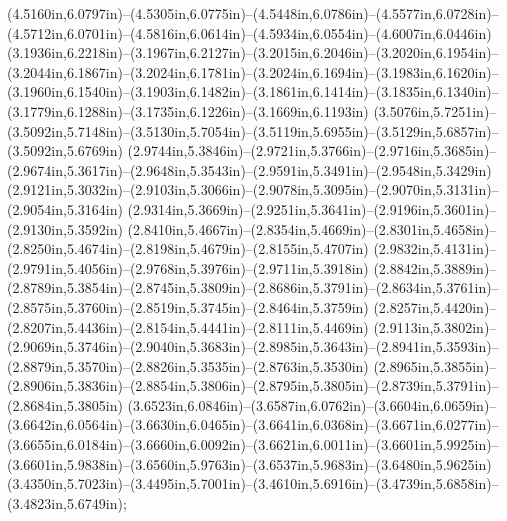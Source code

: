 (4.5160in,6.0797in)--(4.5305in,6.0775in)--(4.5448in,6.0786in)--(4.5577in,6.0728in)--(4.5712in,6.0701in)--(4.5816in,6.0614in)--(4.5934in,6.0554in)--(4.6007in,6.0446in) (3.1936in,6.2218in)--(3.1967in,6.2127in)--(3.2015in,6.2046in)--(3.2020in,6.1954in)--(3.2044in,6.1867in)--(3.2024in,6.1781in)--(3.2024in,6.1694in)--(3.1983in,6.1620in)--(3.1960in,6.1540in)--(3.1903in,6.1482in)--(3.1861in,6.1414in)--(3.1835in,6.1340in)--(3.1779in,6.1288in)--(3.1735in,6.1226in)--(3.1669in,6.1193in) (3.5076in,5.7251in)--(3.5092in,5.7148in)--(3.5130in,5.7054in)--(3.5119in,5.6955in)--(3.5129in,5.6857in)--(3.5092in,5.6769in) (2.9744in,5.3846in)--(2.9721in,5.3766in)--(2.9716in,5.3685in)--(2.9674in,5.3617in)--(2.9648in,5.3543in)--(2.9591in,5.3491in)--(2.9548in,5.3429in) (2.9121in,5.3032in)--(2.9103in,5.3066in)--(2.9078in,5.3095in)--(2.9070in,5.3131in)--(2.9054in,5.3164in) (2.9314in,5.3669in)--(2.9251in,5.3641in)--(2.9196in,5.3601in)--(2.9130in,5.3592in) (2.8410in,5.4667in)--(2.8354in,5.4669in)--(2.8301in,5.4658in)--(2.8250in,5.4674in)--(2.8198in,5.4679in)--(2.8155in,5.4707in) (2.9832in,5.4131in)--(2.9791in,5.4056in)--(2.9768in,5.3976in)--(2.9711in,5.3918in) (2.8842in,5.3889in)--(2.8789in,5.3854in)--(2.8745in,5.3809in)--(2.8686in,5.3791in)--(2.8634in,5.3761in)--(2.8575in,5.3760in)--(2.8519in,5.3745in)--(2.8464in,5.3759in) (2.8257in,5.4420in)--(2.8207in,5.4436in)--(2.8154in,5.4441in)--(2.8111in,5.4469in)
(2.9113in,5.3802in)--(2.9069in,5.3746in)--(2.9040in,5.3683in)--(2.8985in,5.3643in)--(2.8941in,5.3593in)--(2.8879in,5.3570in)--(2.8826in,5.3535in)--(2.8763in,5.3530in) (2.8965in,5.3855in)--(2.8906in,5.3836in)--(2.8854in,5.3806in)--(2.8795in,5.3805in)--(2.8739in,5.3791in)--(2.8684in,5.3805in) (3.6523in,6.0846in)--(3.6587in,6.0762in)--(3.6604in,6.0659in)--(3.6642in,6.0564in)--(3.6630in,6.0465in)--(3.6641in,6.0368in)--(3.6671in,6.0277in)--(3.6655in,6.0184in)--(3.6660in,6.0092in)--(3.6621in,6.0011in)--(3.6601in,5.9925in)--(3.6601in,5.9838in)--(3.6560in,5.9763in)--(3.6537in,5.9683in)--(3.6480in,5.9625in) (3.4350in,5.7023in)--(3.4495in,5.7001in)--(3.4610in,5.6916in)--(3.4739in,5.6858in)--(3.4823in,5.6749in);
